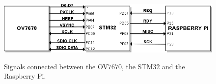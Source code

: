\begin{figure}[ht!]
\begin{center}
\includegraphics[height=0.22\textwidth]{fig/hwconnections}\\
\caption{Signals connected between the OV7670, the STM32 and the Raspberry Pi.}
\label{fig_hwconnections}
\end{center}
\end{figure}
